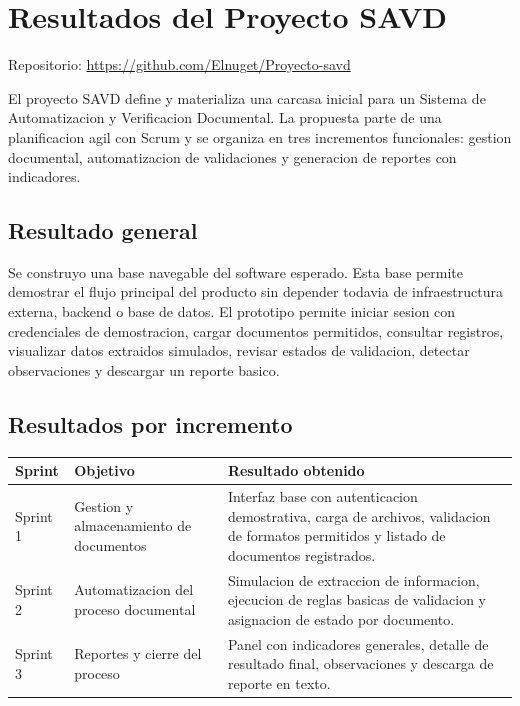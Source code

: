 \documentclass[11pt,letterpaper]{article}
\begin{document}
\section*{Resultados del Proyecto SAVD}

Repositorio: \href{https://github.com/Elnuget/Proyecto-savd}{https://github.com/Elnuget/Proyecto-savd}

El proyecto SAVD define y materializa una carcasa inicial para un Sistema de Automatizacion y Verificacion Documental. La propuesta parte de una planificacion agil con Scrum y se organiza en tres incrementos funcionales: gestion documental, automatizacion de validaciones y generacion de reportes con indicadores.

\subsection*{Resultado general}

Se construyo una base navegable del software esperado. Esta base permite demostrar el flujo principal del producto sin depender todavia de infraestructura externa, backend o base de datos. El prototipo permite iniciar sesion con credenciales de demostracion, cargar documentos permitidos, consultar registros, visualizar datos extraidos simulados, revisar estados de validacion, detectar observaciones y descargar un reporte basico.

\subsection*{Resultados por incremento}

\begin{tabular}{p{2.2cm}p{5.5cm}p{6.5cm}}
\toprule
\textbf{Sprint} & \textbf{Objetivo} & \textbf{Resultado obtenido} \\
\midrule
Sprint 1 & Gestion y almacenamiento de documentos & Interfaz base con autenticacion demostrativa, carga de archivos, validacion de formatos permitidos y listado de documentos registrados. \\
Sprint 2 & Automatizacion del proceso documental & Simulacion de extraccion de informacion, ejecucion de reglas basicas de validacion y asignacion de estado por documento. \\
Sprint 3 & Reportes y cierre del proceso & Panel con indicadores generales, detalle de resultado final, observaciones y descarga de reporte en texto. \\
\bottomrule
\end{tabular}
\end{document}
